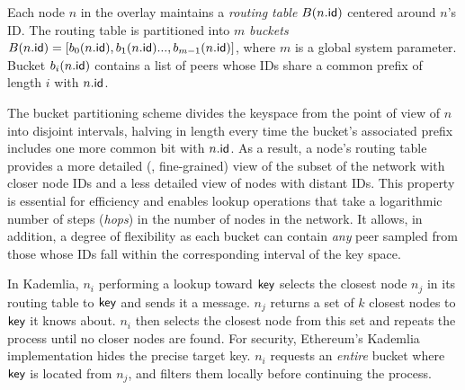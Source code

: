 Each node $n$ in the overlay maintains a \emph{routing table} $B(n.\mathsf{id})$ centered around $n$'s ID. The routing table is partitioned into $m$ \textit{buckets} $B(n.\mathsf{id}) = [b_0(n.\mathsf{id}) ,b_1(n.\mathsf{id})...,b_{m-1}(n.\mathsf{id})]$, where $m$ is a global system parameter.
Bucket $b_i(n.\mathsf{id})$ contains a list of peers whose IDs share a common prefix of length $i$ with $n.\mathsf{id}$.

The bucket partitioning scheme divides the keyspace from the point of view of $n$ into disjoint intervals, halving in length every time the bucket's associated prefix includes one more common bit with $n.\mathsf{id}$.
As a result, a node's routing table provides a more detailed (\ie, fine-grained) view of the subset of the network with closer node IDs and a less detailed view of nodes with distant IDs.
This property is essential for efficiency and enables lookup operations that take a logarithmic number of steps (\emph{hops}) in the number of nodes in the network.
It allows, in addition, a degree of flexibility as each bucket can contain \textit{any} peer sampled from those whose IDs fall within the corresponding interval of the key space.

In Kademlia, $n_i$ performing a lookup toward $\mathsf{key}$ selects the closest node $n_j$ in its routing table to $\mathsf{key}$ and sends it a message. $n_j$ returns a set of $k$ closest nodes to $\mathsf{key}$ it knows about. $n_i$ then selects the closest node from this set and repeats the process until no closer nodes are found.
For security, Ethereum's Kademlia implementation hides the precise target key.
$n_i$ requests an \emph{entire} bucket where $\mathsf{key}$ is located from $n_j$, and filters them locally before continuing the process.







